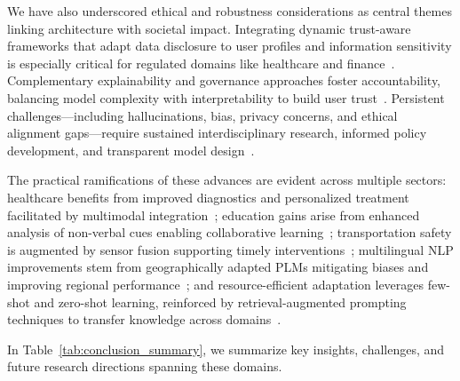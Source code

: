 \documentclass[sigconf]{acmart}
\begin{document}
We have also underscored ethical and robustness considerations as central themes linking architecture with societal impact. Integrating dynamic trust-aware frameworks that adapt data disclosure to user profiles and information sensitivity is especially critical for regulated domains like healthcare and finance~\cite{ref11}. Complementary explainability and governance approaches foster accountability, balancing model complexity with interpretability to build user trust~\cite{ref25,ref28}. Persistent challenges—including hallucinations, bias, privacy concerns, and ethical alignment gaps—require sustained interdisciplinary research, informed policy development, and transparent model design~\cite{ref29,ref30}.

The practical ramifications of these advances are evident across multiple sectors: healthcare benefits from improved diagnostics and personalized treatment facilitated by multimodal integration~\cite{ref21}; education gains arise from enhanced analysis of non-verbal cues enabling collaborative learning~\cite{ref22}; transportation safety is augmented by sensor fusion supporting timely interventions~\cite{ref27}; multilingual NLP improvements stem from geographically adapted PLMs mitigating biases and improving regional performance~\cite{ref30,ref31}; and resource-efficient adaptation leverages few-shot and zero-shot learning, reinforced by retrieval-augmented prompting techniques to transfer knowledge across domains~\cite{ref34,ref40}.

In Table~\ref{tab:conclusion_summary}, we summarize key insights, challenges, and future research directions spanning these domains.
\end{document}
